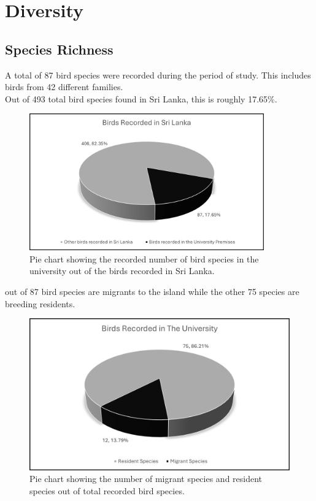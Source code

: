 \chapter{Diversity}
\label{cp:Diversity}

\section{Species Richness}
A total of 87 bird species were recorded during the period of study. This includes birds from 42 different families.\\
Out of 493 total bird species found in Sri Lanka, this is roughly 17.65\%.

\begin{figure}[!htpb]
    \centering
    \includegraphics[width=0.9\textwidth]{Figures/pieChart1.png}
    \caption[]{Pie chart showing the recorded number of bird species in the university out of the birds recorded in Sri Lanka.}
    \label{fig:figure-01}
\end{figure}
 out of 87 bird species are migrants to the island while the other 75 species are breeding residents. 

\begin{figure}[!htpb]
    \centering
    \includegraphics[width=\linewidth]{Figures/pieChart2.png}
    \caption[]{Pie chart showing the number of migrant species and resident species out of total recorded bird species.}
    \label{fig:figure-01}
\end{figure}
